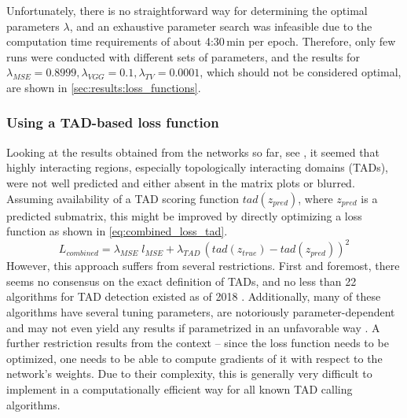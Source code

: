 Unfortunately, there is no straightforward way for determining the optimal parameters $\lambda$,
and an exhaustive parameter search was infeasible due to the computation time requirements of about 4:30\,min per epoch.
Therefore, only few runs were conducted with different sets of parameters,
and the results for $\lambda_\mathit{MSE} = 0.8999, \lambda_\mathit{VGG}=0.1, \lambda_\mathit{TV}=0.0001$,
which should not be considered optimal, are shown in \cref{sec:results:loss_functions}.

\subsubsection{Using a TAD-based loss function}
Looking at the results obtained from the networks so far, see \xxx, it seemed that highly interacting regions,
especially topologically interacting domains (TADs), were not well predicted and either absent
in the matrix plots or blurred.
Assuming availability of a TAD scoring function $\mathit{tad}(z_\mathit{pred})$, where $z_\mathit{pred}$ is a predicted submatrix,
this might be improved by directly optimizing a loss function as shown in \cref{eq:combined_loss_tad}.
\begin{equation}
 L_\mathit{combined} = \lambda_\mathit{MSE}\;l_\mathit{MSE} + \lambda_\mathit{TAD} \, (\mathit{tad}(z_\mathit{true}) - \mathit{tad}(z_\mathit{pred}))^2 \label{eq:combined_loss_tad}
\end{equation}
However, this approach suffers from several restrictions.
First and foremost, there seems no consensus on the exact definition of TADs, 
and no less than 22 algorithms for TAD detection existed as of 2018 \cite{Dali2017,Zufferey2018}.
Additionally, many of these algorithms have several tuning parameters, are notoriously parameter-dependent
and may not even yield any results if parametrized in an unfavorable way \cite{Zufferey2018}. 
A further restriction results from the context -- since the loss function needs to be optimized,
one needs to be able to compute gradients of it with respect to the network's weights.
Due to their complexity, this is generally very difficult to implement in a computationally efficient way for all known TAD calling algorithms.

